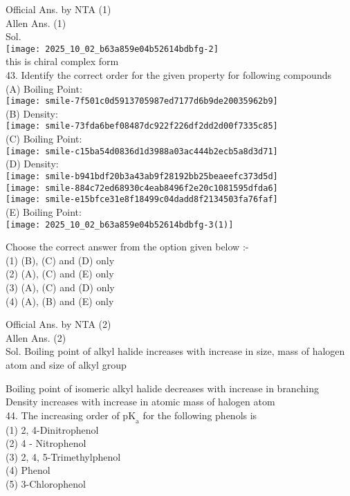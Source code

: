 \documentclass[10pt]{article}
\begin{document}
Official Ans. by NTA (1)\\
Allen Ans. (1)\\
Sol.\\
\texttt{[image: 2025\_10\_02\_b63a859e04b52614bdbfg-2]}\\
this is chiral complex form\\
43. Identify the correct order for the given property for following compounds\\
(A) Boiling Point:\\
\texttt{[image: smile-7f501c0d5913705987ed7177d6b9de20035962b9]}\\
(B) Density:\\
\texttt{[image: smile-73fda6bef08487dc922f226df2dd2d00f7335c85]}\\
(C) Boiling Point:\\
\texttt{[image: smile-c15ba54d0836d1d3988a03ac444b2ecb5a8d3d71]}\\
(D) Density:\\
\texttt{[image: smile-b941bdf20b3a43ab9f28192bb25beaeefc373d5d]}\\
\texttt{[image: smile-884c72ed68930c4eab8496f2e20c1081595dfda6]}\\
\texttt{[image: smile-e15bfce31e8f18499c04dadd8f2134503fa76faf]}\\
(E) Boiling Point:\\
\texttt{[image: 2025\_10\_02\_b63a859e04b52614bdbfg-3(1)]}

Choose the correct answer from the option given below :-\\
(1) (B), (C) and (D) only\\
(2) (A), (C) and (E) only\\
(3) (A), (C) and (D) only\\
(4) (A), (B) and (E) only

Official Ans. by NTA (2)\\
Allen Ans. (2)\\
Sol. Boiling point of alkyl halide increases with increase in size, mass of halogen atom and size of alkyl group

Boiling point of isomeric alkyl halide decreases with increase in branching\\
Density increases with increase in atomic mass of halogen atom\\
44. The increasing order of \(\mathrm{pK}_{\mathrm{a}}\) for the following phenols is\\
(1) 2, 4-Dinitrophenol\\
(2) 4 - Nitrophenol\\
(3) 2, 4, 5-Trimethylphenol\\
(4) Phenol\\
(5) 3-Chlorophenol
\end{document}
